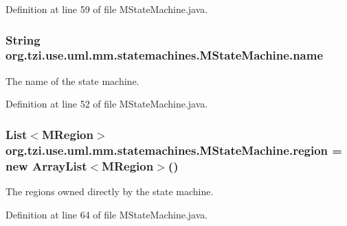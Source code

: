 Definition at line 59 of file M\-State\-Machine.\-java.

\hypertarget{classorg_1_1tzi_1_1use_1_1uml_1_1mm_1_1statemachines_1_1_m_state_machine_a538bcb13ae44862dd544ce80edc5fee5}{
\subsubsection[{name}]{\setlength{\rightskip}{0pt plus 5cm}String org.\-tzi.\-use.\-uml.\-mm.\-statemachines.\-M\-State\-Machine.\-name\hspace{0.3cm}{\ttfamily [protected]}}}\label{classorg_1_1tzi_1_1use_1_1uml_1_1mm_1_1statemachines_1_1_m_state_machine_a538bcb13ae44862dd544ce80edc5fee5}
The name of the state machine. 

Definition at line 52 of file M\-State\-Machine.\-java.

\hypertarget{classorg_1_1tzi_1_1use_1_1uml_1_1mm_1_1statemachines_1_1_m_state_machine_a91928269ee5b72b57106b54b51c90a36}{
\subsubsection[{region}]{\setlength{\rightskip}{0pt plus 5cm}List$<${\bf M\-Region}$>$ org.\-tzi.\-use.\-uml.\-mm.\-statemachines.\-M\-State\-Machine.\-region = new Array\-List$<${\bf M\-Region}$>$()\hspace{0.3cm}{\ttfamily [protected]}}}\label{classorg_1_1tzi_1_1use_1_1uml_1_1mm_1_1statemachines_1_1_m_state_machine_a91928269ee5b72b57106b54b51c90a36}
The regions owned directly by the state machine. 

Definition at line 64 of file M\-State\-Machine.\-java.

